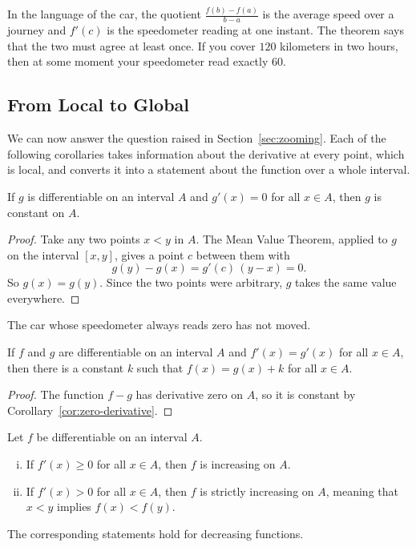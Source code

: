 In the language of the car, the quotient $\frac{f(b) - f(a)}{b - a}$ is the average speed over a journey and $f'(c)$ is the speedometer reading at one instant.  The theorem says that the two must agree at least once.  If you cover $120$ kilometers in two hours, then at some moment your speedometer read exactly $60$.

\subsection{From Local to Global}

We can now answer the question raised in Section~\ref{sec:zooming}.  Each of the following corollaries takes information about the derivative at every point, which is local, and converts it into a statement about the function over a whole interval.

\begin{corollary}\label{cor:zero-derivative}
If $g$ is differentiable on an interval $A$ and $g'(x) = 0$ for all $x \in A$, then $g$ is constant on $A$.
\end{corollary}

\begin{proof}
Take any two points $x < y$ in $A$.  The Mean Value Theorem, applied to $g$ on the interval $[x,y]$, gives a point $c$ between them with
\[ g(y) - g(x) = g'(c)\,(y - x) = 0. \]
So $g(x) = g(y)$.  Since the two points were arbitrary, $g$ takes the same value everywhere.
\end{proof}

The car whose speedometer always reads zero has not moved.

\begin{corollary}\label{cor:same-derivative}
If $f$ and $g$ are differentiable on an interval $A$ and $f'(x) = g'(x)$ for all $x \in A$, then there is a constant $k$ such that $f(x) = g(x) + k$ for all $x \in A$.
\end{corollary}

\begin{proof}
The function $f - g$ has derivative zero on $A$, so it is constant by Corollary~\ref{cor:zero-derivative}.
\end{proof}

\begin{corollary}\label{cor:monotone}
Let $f$ be differentiable on an interval $A$.
\begin{enumerate}[(i)]
	\item If $f'(x) \geq 0$ for all $x \in A$, then $f$ is increasing on $A$.
	\item If $f'(x) > 0$ for all $x \in A$, then $f$ is strictly increasing on $A$, meaning that $x < y$ implies $f(x) < f(y)$.
\end{enumerate}
The corresponding statements hold for decreasing functions.
\end{corollary}

